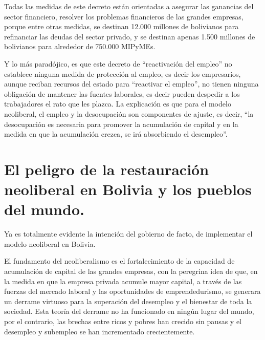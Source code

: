 \documentclass[a4paper, nobind]{templates/ociamthesis}
\begin{document}
Todas las medidas de este decreto están orientadas a asegurar las ganancias del sector financiero, resolver los problemas financieros de las grandes empresas, porque entre otras medidas, se destinan 12.000 millones de bolivianos para refinanciar las deudas del sector privado, y se destinan apenas 1.500 millones de bolivianos para alrededor de 750.000 MIPyMEs.

Y lo más paradójico, es que este decreto de ``reactivación del empleo'' no establece ninguna medida de protección al empleo, es decir los empresarios, aunque reciban recursos del estado para ``reactivar el empleo'', no tienen ninguna obligación de mantener las fuentes laborales, es decir pueden despedir a los trabajadores el rato que les plazca. La explicación es que para el modelo neoliberal, el empleo y la desocupación son componentes de ajuste, es decir, ``la desocupación es necesaria para promover la acumulación de capital y en la medida en que la acumulación crezca, se irá absorbiendo el desempleo''.

\hypertarget{el-peligro-de-la-restauraciuxf3n-neoliberal-en-bolivia-y-los-pueblos-del-mundo.}{%
\section{El peligro de la restauración neoliberal en Bolivia y los pueblos del mundo.}\label{el-peligro-de-la-restauraciuxf3n-neoliberal-en-bolivia-y-los-pueblos-del-mundo.}}

Ya es totalmente evidente la intención del gobierno de facto, de implementar el modelo neoliberal en Bolivia.

El fundamento del neoliberalismo es el fortalecimiento de la capacidad de acumulación de capital de las grandes empresas, con la peregrina idea de que, en la medida en que la empresa privada acumule mayor capital, a través de las fuerzas del mercado laboral y las oportunidades de emprendedurismo, se generara un derrame virtuoso para la superación del desempleo y el bienestar de toda la sociedad. Esta teoría del derrame no ha funcionado en ningún lugar del mundo, por el contrario, las brechas entre ricos y pobres han crecido sin pausas y el desempleo y subempleo se han incrementado crecientemente.
\end{document}

